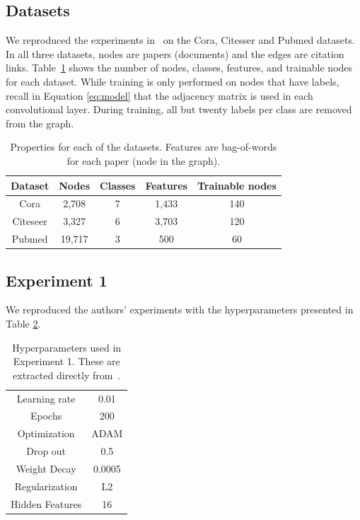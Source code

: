 \subsection{Datasets}

We reproduced the experiments in~\cite{Kipf2016} on the Cora, Citesser and Pubmed datasets. In all three datasets, nodes are papers (documents) and the edges are citation links. Table~\ref{tab:datasets} shows the number of nodes, classes, features, and trainable nodes for each dataset. While training is only performed on nodes that have labels, recall in Equation \ref{eq:model} that the adjacency matrix is used in each convolutional layer. During training, all but twenty labels per class are removed from the graph. 

\begin {table}[ht!]
  \begin{center}
    \begin{tabular}{|c|c|c|c|c|}
    \hline
    Dataset  & Nodes  & Classes & Features & Trainable nodes\\
    \hline 
    Cora     & 2,708  & 7       & 1,433    & 140 \\ 
    Citeseer & 3,327  & 6       & 3,703    & 120  \\  
    Pubmed   & 19,717 & 3       & 500      & 60   \\
    \hline
    \end{tabular}
  \end{center}
\caption {Properties for each of the datasets. Features are bag-of-words for each paper (node in the graph).} \label{tab:datasets} 
\end{table}

\subsection{Experiment 1}

We reproduced the authors' experiments with the hyperparameters presented in Table \ref{tab:hyperparameters1}.

\begin {table}[ht!]
  \begin{center}
    \begin{tabular}{|c|c|}
    \hline
    Learning rate     & 0.01 \\ 
    Epochs            & 200  \\ 
    Optimization      & ADAM \\
    Drop out          & 0.5   \\
    Weight Decay      & 0.0005 \\
    Regularization    & L2    \\
    Hidden Features   & 16    \\
    \hline
    \end{tabular}
  \end{center}
\caption {Hyperparameters used in Experiment 1. These are extracted directly from~\cite{Kipf2016}.} \label{tab:hyperparameters1} 
\end{table}

